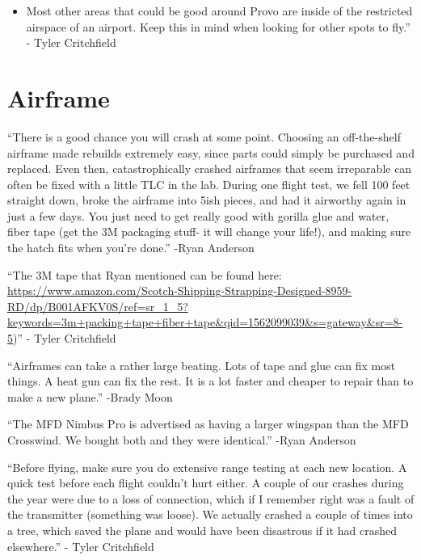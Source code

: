 \begin{itemize}
\tightlist
\item
  {Most other areas that could be good around Provo are inside of the
  restricted airspace of an airport. Keep this in mind when looking for
  other spots to fly.'' - Tyler Critchfield}
\end{itemize}

\hypertarget{h.49zf76hgeobq}{\section{\texorpdfstring{{Airframe}}{Airframe}}\label{h.49zf76hgeobq}}

{``There is a good chance you will crash at some point. Choosing an
off-the-shelf airframe made rebuilds extremely easy, since parts could
simply be purchased and replaced. Even then, catastrophically crashed
airframes that seem irreparable can often be fixed with a little TLC in
the lab. During one flight test, we fell 100 feet straight down, broke
the airframe into 5ish pieces, and had it airworthy again in just a few
days. You just need to get really good with gorilla glue and water,
fiber tape (get the 3M packaging stuff- it will change your life!), and
making sure the hatch fits when you're done.'' -Ryan Anderson}

{}

{``The 3M tape that Ryan mentioned can be found here:
}{\href{https://www.google.com/url?q=https://www.amazon.com/Scotch-Shipping-Strapping-Designed-8959-RD/dp/B001AFKV0S/ref\%3Dsr_1_5?keywords\%3D3m\%2Bpacking\%2Btape\%2Bfiber\%2Btape\%26qid\%3D1562099039\%26s\%3Dgateway\%26sr\%3D8-5\&sa=D\&ust=1564438983448000}{https://www.amazon.com/Scotch-Shipping-Strapping-Designed-8959-RD/dp/B001AFKV0S/ref=sr\_1\_5?keywords=3m+packing+tape+fiber+tape\&qid=1562099039\&s=gateway\&sr=8-5}}{)''
- Tyler Critchfield}

{}

{``Airframes can take a rather large beating. Lots of tape and glue can
fix most things. A heat gun can fix the rest. It is a lot faster and
cheaper to repair than to make a new plane.'' -Brady Moon}

{}

{``The MFD Nimbus Pro is advertised as having a larger wingspan than the
MFD Crosswind. We bought both and they were identical.'' -Ryan Anderson}

{}

{``Before flying, make sure you do extensive range testing at each new
location. A quick test before each flight couldn't hurt either. A couple
of our crashes during the year were due to a loss of connection, which
if I remember right was a fault of the transmitter (something was
loose). We actually crashed a couple of times into a tree, which saved
the plane and would have been disastrous if it had crashed elsewhere.''
- Tyler Critchfield}

